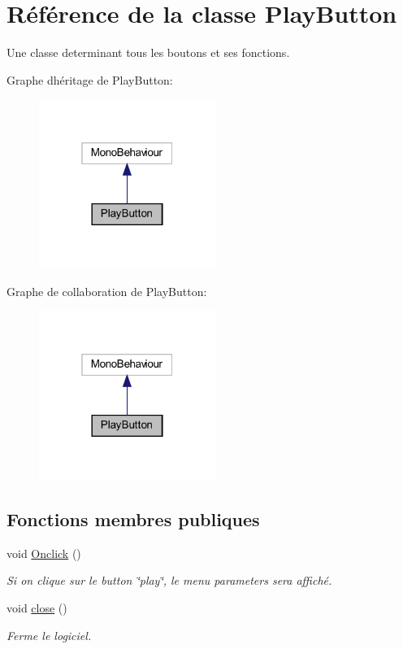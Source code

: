 \hypertarget{class_play_button}{}\section{Référence de la classe Play\+Button}
\label{class_play_button}


Une classe determinant tous les boutons et ses fonctions.  




Graphe d\textquotesingle{}héritage de Play\+Button\+:\nopagebreak
\begin{figure}[H]
\begin{center}
\leavevmode
\includegraphics[width=163pt]{class_play_button__inherit__graph}
\end{center}
\end{figure}


Graphe de collaboration de Play\+Button\+:\nopagebreak
\begin{figure}[H]
\begin{center}
\leavevmode
\includegraphics[width=163pt]{class_play_button__coll__graph}
\end{center}
\end{figure}
\subsection*{Fonctions membres publiques}
\begin{DoxyCompactItemize}
\item 
void \mbox{\hyperlink{class_play_button_ae50ebca92c570fc8eb2cdaa79eff1865}{Onclick}} ()
\begin{DoxyCompactList}\small\item\em Si on clique sur le button \char`\"{}play\char`\"{}, le menu parameters sera affiché. \end{DoxyCompactList}\item 
void \mbox{\hyperlink{class_play_button_a53fd8894bbfa2d9ee15aab0d619e2bf0}{close}} ()
\begin{DoxyCompactList}\small\item\em Ferme le logiciel. \end{DoxyCompactList}\end{DoxyCompactItemize}
